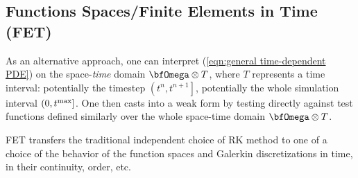 \subsection*{Functions Spaces/Finite Elements in Time (FET)}
    As an alternative approach, one can interpret (\ref{eqn:general time-dependent PDE}) on the space-\emph{time} domain $\bfOmega\otimes T$, where $T$ represents a time interval: potentially the timestep $\left(t^{n}, t^{n + 1}\right]$, potentially the whole simulation interval $\left(0, t^{\rm max}\right]$. One then casts into a weak form by testing directly against test functions defined similarly over the whole space-time domain $\bfOmega\otimes T$.
    
    FET transfers the traditional independent choice of RK method to one of a choice of the behavior of the function spaces and Galerkin discretizations in time, in their continuity, order, etc.
    
